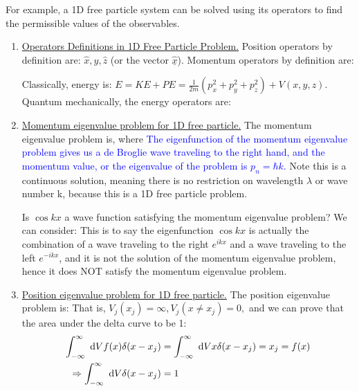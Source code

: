 \documentclass{school-22.101-notes}
\begin{document}
For example, a 1D free particle system can be solved using its operators to find the permissible values of the observables. 
\begin{enumerate}
\item \uline{Operators Definitions in 1D Free Particle Problem.} Position operators by definition are: $\hat{x}, \hat{y}, \hat{z}$ (or the vector $\hat{\underline{x}}$). Momentum operators by definition are:

Classically, energy is: $E = KE + PE = \frac{1}{2m} (p_x^2 + p_y^2 + p_z^2) + V(x,y,z)$. Quantum mechanically, the energy operators are:

\item \uline{Momentum eigenvalue problem for 1D free particle.} The momentum eigenvalue problem is, 
where
\textcolor{blue}{The eigenfunction of the momentum eigenvalue problem gives us a de Broglie wave traveling to the right hand, and the momentum value, or the eigenvalue of the problem is $p_n = \hbar k$.} Note this is a continuous solution, meaning there is no restriction on wavelength $\lambda$ or wave number k, because this is a 1D free particle problem. 

Is $\cos kx$ a wave function satisfying the momentum eigenvalue problem? We can consider:
This is to say the eigenfunction $\cos kx$ is actually the combination of a wave traveling to the right $e^{ikx}$ and a wave traveling to the left $e^{-ikx}$, and it is not the solution of the momentum eigenvalue problem, hence it does NOT satisfy the momentum eigenvalue problem. 


\item \uline{Position eigenvalue problem for 1D free particle.} The position eigenvalue problem is:
That is, $V_j(x_j) = \infty, V_j (x\neq x_j) = 0,$ and we can prove that the area under the delta curve to be 1: 
\begin{align}
\int_{-\infty}^{\infty} \mbox{ }\mathrm{d} V f(x) \delta(x-x_j) &=  \int_{-\infty}^{\infty} \mbox{ }\mathrm{d} V x \delta(x-x_j) = x_j = f(x) \\
\Rightarrow \int_{-\infty}^{\infty} \mbox{ }\mathrm{d} V \delta(x-x_j) &= 1 
\end{align}



\end{enumerate}
\end{document}
